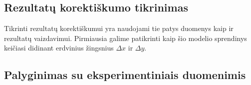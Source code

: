 \subsection{Rezultatų korektiškumo tikrinimas}

Tikrinti rezultatų korektiškumui yra naudojami tie patys duomenys kaip ir rezultatų vaizdavimui. Pirmiausia galime patikrinti kaip šio modelio sprendinys keičiasi didinant erdvinius žingsnius $\Delta x$ ir $\Delta y$.




\subsection{Palyginimas su eksperimentiniais duomenimis}
